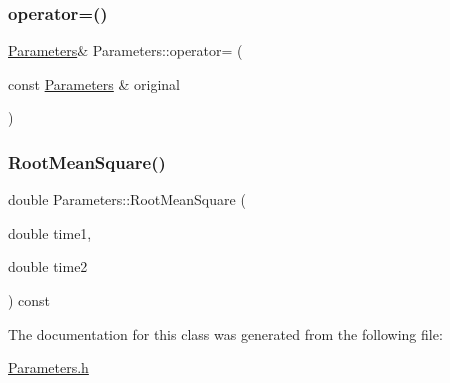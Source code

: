 \hypertarget{classParameters_af3c89e86a74f3cd97b14c3a2e71d4b16}{}\label{classParameters_af3c89e86a74f3cd97b14c3a2e71d4b16} 
\subsubsection{\texorpdfstring{operator=()}{operator=()}}
{\footnotesize\ttfamily \hyperlink{classParameters}{Parameters}\& Parameters\+::operator= (\begin{DoxyParamCaption}\item[{const \hyperlink{classParameters}{Parameters} \&}]{original }\end{DoxyParamCaption})}

\hypertarget{classParameters_a51474994c078edab356d33c5d56504ab}{}\label{classParameters_a51474994c078edab356d33c5d56504ab} 
\subsubsection{\texorpdfstring{Root\+Mean\+Square()}{RootMeanSquare()}}
{\footnotesize\ttfamily double Parameters\+::\+Root\+Mean\+Square (\begin{DoxyParamCaption}\item[{double}]{time1,  }\item[{double}]{time2 }\end{DoxyParamCaption}) const}



The documentation for this class was generated from the following file\+:\begin{DoxyCompactItemize}
\item 
\hyperlink{Parameters_8h}{Parameters.\+h}\end{DoxyCompactItemize}
